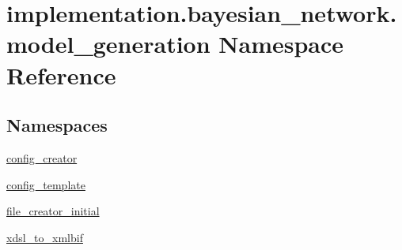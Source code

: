 \hypertarget{namespaceimplementation_1_1bayesian__network_1_1model__generation}{}\section{implementation.\+bayesian\+\_\+network.\+model\+\_\+generation Namespace Reference}
\label{namespaceimplementation_1_1bayesian__network_1_1model__generation}
\subsection*{Namespaces}
\begin{DoxyCompactItemize}
\item 
 \hyperlink{namespaceimplementation_1_1bayesian__network_1_1model__generation_1_1config__creator}{config\+\_\+creator}
\item 
 \hyperlink{namespaceimplementation_1_1bayesian__network_1_1model__generation_1_1config__template}{config\+\_\+template}
\item 
 \hyperlink{namespaceimplementation_1_1bayesian__network_1_1model__generation_1_1file__creator__initial}{file\+\_\+creator\+\_\+initial}
\item 
 \hyperlink{namespaceimplementation_1_1bayesian__network_1_1model__generation_1_1xdsl__to__xmlbif}{xdsl\+\_\+to\+\_\+xmlbif}
\end{DoxyCompactItemize}
